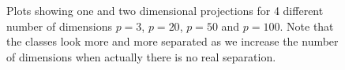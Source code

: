 \documentclass[12]{report}
\begin{document}
\begin{figure}[hbtp]
       \caption{Plots showing one and two dimensional projections for 4 different number of dimensions $p=3$, $p=20$, $p=50$ and $p=100$. Note that the classes look more and more separated as we increase the number of dimensions when actually there is no real separation.  }
       \label{dist_1d}
\end{figure}
\end{document}
